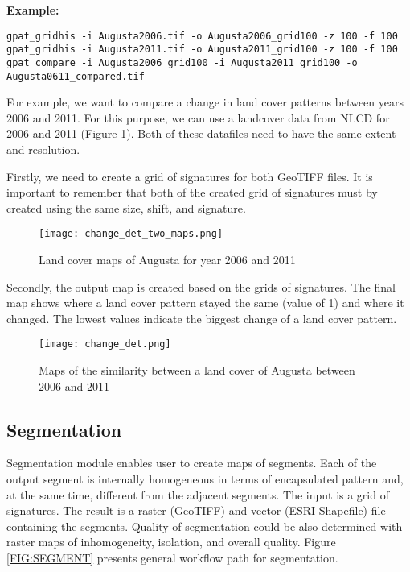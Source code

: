 {\bf Example:}

\begin{minipage}{\linewidth}
\begin{lstlisting}
gpat_gridhis -i Augusta2006.tif -o Augusta2006_grid100 -z 100 -f 100
gpat_gridhis -i Augusta2011.tif -o Augusta2011_grid100 -z 100 -f 100
gpat_compare -i Augusta2006_grid100 -i Augusta2011_grid100 -o Augusta0611_compared.tif
\end{lstlisting}
\end{minipage}

For example, we want to compare a change in land cover patterns between years 2006 and 2011. 
For this purpose, we can use a landcover data from NLCD for 2006 and 2011 (Figure \ref{FIG:CHANGEDET1}).
Both of these datafiles need to have the same extent and resolution.

Firstly, we need to create a grid of signatures for both GeoTIFF files.
It is important to remember that both of the created grid of signatures must by created using the same size, shift, and signature.

\begin{figure}[H]
	\centering
	\texttt{[image: change\_det\_two\_maps.png]}
	\caption{Land cover maps of Augusta for year 2006 and 2011}
	\label{FIG:CHANGEDET1}
\end{figure}

Secondly, the output map is created based on the grids of signatures.
The final map shows where a land cover pattern stayed the same (value of 1) and where it changed. 
The lowest values indicate the biggest change of a land cover pattern.

\begin{figure}[H]
	\centering
	\texttt{[image: change\_det.png]}
	\caption{Maps of the similarity between a land cover of Augusta between 2006 and 2011}
	\label{FIG:CHANGEDET2}
\end{figure}

\FloatBarrier

\subsection{Segmentation \label{segmentation}}

Segmentation module enables user to create maps of segments.
Each of the output segment is internally homogeneous in terms of encapsulated pattern and, at the same time, different from the adjacent segments.
The input is a grid of signatures.
The result is a raster (GeoTIFF) and vector (ESRI Shapefile) file containing the segments.
Quality of segmentation could be also determined with raster maps of inhomogeneity, isolation, and overall quality.
Figure \ref{FIG:SEGMENT} presents general workflow path for segmentation. 

